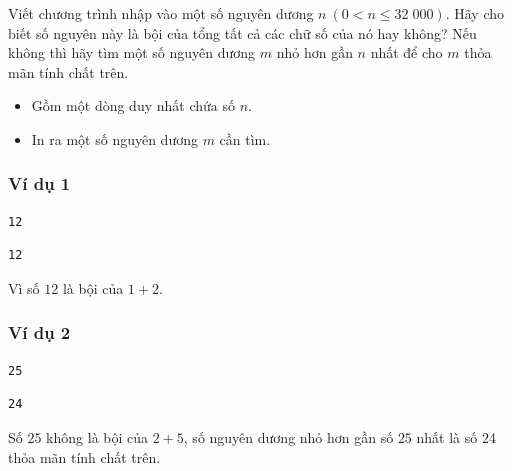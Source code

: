 
Viết chương trình nhập vào một số nguyên dương $n\ (0 < n \le 32\;000)$. Hãy cho
biết số nguyên này là bội của tổng tất cả các chữ số của nó hay không? Nếu không
thì hãy tìm một số nguyên dương $m$ nhỏ hơn gần $n$ nhất để cho $m$ thỏa mãn tính chất
trên.

\begin{itemize}
    \item Gồm một dòng duy nhất chứa số $n$.
\end{itemize}

\begin{itemize}
    \item In ra một số nguyên dương $m$ cần tìm.
\end{itemize}


\subsubsection*{Ví dụ 1}
\begin{makesample}
\begin{lstlisting}
12
\end{lstlisting}
\nextsample
\begin{lstlisting}
12
\end{lstlisting}
\end{makesample}

\begin{explain}
Vì số $12$ là bội của $1+2$.
\end{explain}

\subsubsection*{Ví dụ 2}
\begin{makesample}
\begin{lstlisting}
25
\end{lstlisting}
\nextsample
\begin{lstlisting}
24
\end{lstlisting}
\end{makesample}

\begin{explain}
Số $25$ không là bội của $2 + 5$, số
nguyên dương nhỏ hơn gần số $25$
nhất là số $24$ thỏa mãn tính chất
trên.
\end{explain}
